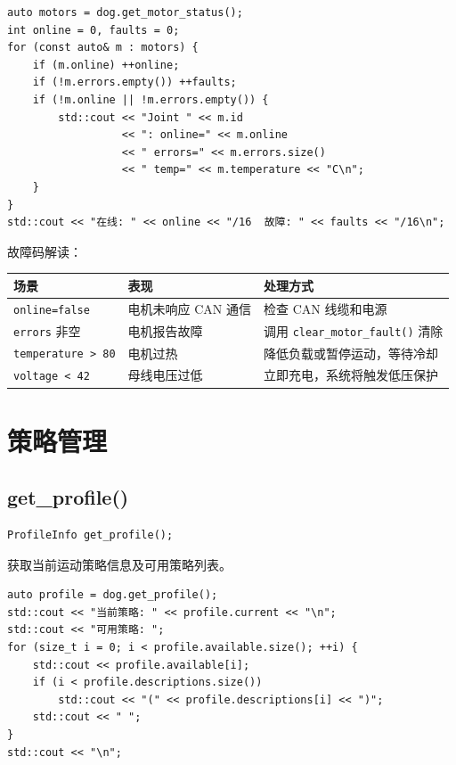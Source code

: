 \documentclass[a4paper,11pt,openany]{book}
\begin{document}
\begin{lstlisting}[style=cpp]
auto motors = dog.get_motor_status();
int online = 0, faults = 0;
for (const auto& m : motors) {
    if (m.online) ++online;
    if (!m.errors.empty()) ++faults;
    if (!m.online || !m.errors.empty()) {
        std::cout << "Joint " << m.id
                  << ": online=" << m.online
                  << " errors=" << m.errors.size()
                  << " temp=" << m.temperature << "C\n";
    }
}
std::cout << "在线: " << online << "/16  故障: " << faults << "/16\n";
\end{lstlisting}

故障码解读：

\begin{longtable}{lll}
\toprule
场景 & 表现 & 处理方式 \\
\midrule
\endhead
\texttt{online=false} & 电机未响应 CAN 通信 & 检查 CAN 线缆和电源 \\
\texttt{errors} 非空 & 电机报告故障 & 调用 \texttt{clear\_motor\_fault()} 清除 \\
\texttt{temperature > 80} & 电机过热 & 降低负载或暂停运动，等待冷却 \\
\texttt{voltage < 42} & 母线电压过低 & 立即充电，系统将触发低压保护 \\
\bottomrule
\end{longtable}

\section{策略管理}

\subsection{get\_profile()}

\begin{lstlisting}[style=cpp,numbers=none]
ProfileInfo get_profile();
\end{lstlisting}

获取当前运动策略信息及可用策略列表。

\begin{lstlisting}[style=cpp]
auto profile = dog.get_profile();
std::cout << "当前策略: " << profile.current << "\n";
std::cout << "可用策略: ";
for (size_t i = 0; i < profile.available.size(); ++i) {
    std::cout << profile.available[i];
    if (i < profile.descriptions.size())
        std::cout << "(" << profile.descriptions[i] << ")";
    std::cout << " ";
}
std::cout << "\n";
\end{lstlisting}
\end{document}
